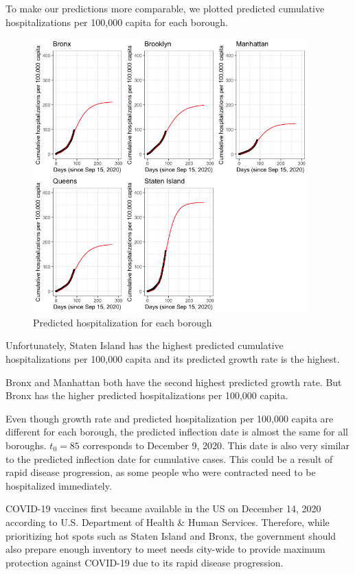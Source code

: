 \documentclass[
]{article}
\begin{document}
To make our predictions more comparable, we plotted predicted cumulative
hospitalizations per 100,000 capita for each borough.

\begin{figure}
\centering
\includegraphics[width=4.16667in,height=\textheight]{plots/hosp_plots/predictive/hosp_all_pred.png}
\caption{Predicted hospitalization for each borough}
\end{figure}

Unfortunately, Staten Island has the highest predicted cumulative
hospitalizations per 100,000 capita and its predicted growth rate is the
highest.

Bronx and Manhattan both have the second highest predicted growth rate.
But Bronx has the higher predicted hospitalizations per 100,000 capita.

Even though growth rate and predicted hospitalization per 100,000 capita
are different for each borough, the predicted inflection date is almost
the same for all boroughs. \(t_0 = 85\) corresponds to December 9, 2020.
This date is also very similar to the predicted inflection date for
cumulative cases. This could be a result of rapid disease progression,
as some people who were contracted need to be hospitalized immediately.

COVID-19 vaccines first became available in the US on December 14, 2020
according to U.S. Department of Health \& Human Services. Therefore,
while prioritizing hot spots such as Staten Island and Bronx, the
government should also prepare enough inventory to meet needs city-wide
to provide maximum protection against COVID-19 due to its rapid disease
progression.
\end{document}
